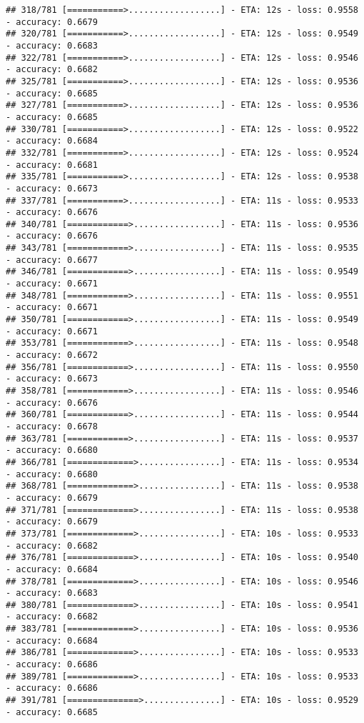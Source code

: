 \documentclass[
]{article}
\begin{document}
\begin{verbatim}
## 318/781 [===========>..................] - ETA: 12s - loss: 0.9558 - accuracy: 0.6679
## 320/781 [===========>..................] - ETA: 12s - loss: 0.9549 - accuracy: 0.6683
## 322/781 [===========>..................] - ETA: 12s - loss: 0.9546 - accuracy: 0.6682
## 325/781 [===========>..................] - ETA: 12s - loss: 0.9536 - accuracy: 0.6685
## 327/781 [===========>..................] - ETA: 12s - loss: 0.9536 - accuracy: 0.6685
## 330/781 [===========>..................] - ETA: 12s - loss: 0.9522 - accuracy: 0.6684
## 332/781 [===========>..................] - ETA: 12s - loss: 0.9524 - accuracy: 0.6681
## 335/781 [===========>..................] - ETA: 12s - loss: 0.9538 - accuracy: 0.6673
## 337/781 [===========>..................] - ETA: 11s - loss: 0.9533 - accuracy: 0.6676
## 340/781 [============>.................] - ETA: 11s - loss: 0.9536 - accuracy: 0.6676
## 343/781 [============>.................] - ETA: 11s - loss: 0.9535 - accuracy: 0.6677
## 346/781 [============>.................] - ETA: 11s - loss: 0.9549 - accuracy: 0.6671
## 348/781 [============>.................] - ETA: 11s - loss: 0.9551 - accuracy: 0.6671
## 350/781 [============>.................] - ETA: 11s - loss: 0.9549 - accuracy: 0.6671
## 353/781 [============>.................] - ETA: 11s - loss: 0.9548 - accuracy: 0.6672
## 356/781 [============>.................] - ETA: 11s - loss: 0.9550 - accuracy: 0.6673
## 358/781 [============>.................] - ETA: 11s - loss: 0.9546 - accuracy: 0.6676
## 360/781 [============>.................] - ETA: 11s - loss: 0.9544 - accuracy: 0.6678
## 363/781 [============>.................] - ETA: 11s - loss: 0.9537 - accuracy: 0.6680
## 366/781 [=============>................] - ETA: 11s - loss: 0.9534 - accuracy: 0.6680
## 368/781 [=============>................] - ETA: 11s - loss: 0.9538 - accuracy: 0.6679
## 371/781 [=============>................] - ETA: 11s - loss: 0.9538 - accuracy: 0.6679
## 373/781 [=============>................] - ETA: 10s - loss: 0.9533 - accuracy: 0.6682
## 376/781 [=============>................] - ETA: 10s - loss: 0.9540 - accuracy: 0.6684
## 378/781 [=============>................] - ETA: 10s - loss: 0.9546 - accuracy: 0.6683
## 380/781 [=============>................] - ETA: 10s - loss: 0.9541 - accuracy: 0.6682
## 383/781 [=============>................] - ETA: 10s - loss: 0.9536 - accuracy: 0.6684
## 386/781 [=============>................] - ETA: 10s - loss: 0.9533 - accuracy: 0.6686
## 389/781 [=============>................] - ETA: 10s - loss: 0.9533 - accuracy: 0.6686
## 391/781 [==============>...............] - ETA: 10s - loss: 0.9529 - accuracy: 0.6685

\end{verbatim}
\end{document}
